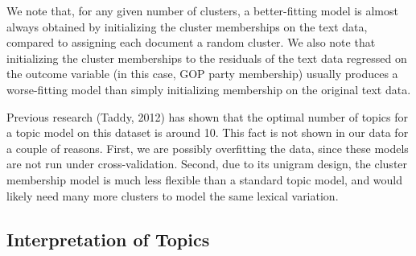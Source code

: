 \documentclass[12pt]{article}
\begin{document}
We note that, for any given number of clusters, a better-fitting model is almost always obtained by initializing the cluster memberships on the text data, compared to assigning each document a random cluster.
We also note that initializing the cluster memberships to the residuals of the text data regressed on the outcome variable (in this case, GOP party membership) usually produces a worse-fitting model than simply initializing membership on the original text data.


Previous research (Taddy, 2012) has shown that the optimal number of topics for a topic model on this dataset is around 10. This fact is not shown in our data for a couple of reasons. First, we are possibly overfitting the data, since these models are not run under cross-validation. Second, due to its unigram design, the cluster membership model is much less flexible than a standard topic model, and would likely need many more clusters to model the same lexical variation.




\subsection{Interpretation of Topics}
\end{document}
